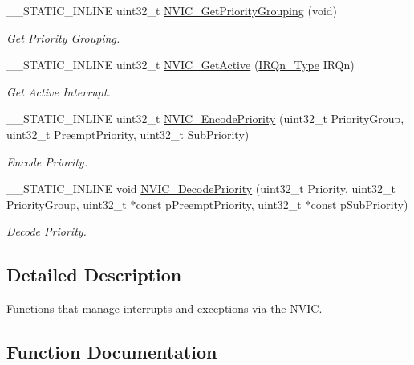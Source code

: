 \begin{DoxyCompactItemize}
\+\_\+\+\_\+\+S\+T\+A\+T\+I\+C\+\_\+\+I\+N\+L\+I\+NE uint32\+\_\+t \mbox{\hyperlink{group___c_m_s_i_s___core___n_v_i_c_functions_ga394f7ce2ca826c0da26284d17ac6524d}{N\+V\+I\+C\+\_\+\+Get\+Priority\+Grouping}} (void)
\begin{DoxyCompactList}\small\item\em Get Priority Grouping. \end{DoxyCompactList}\item 
\+\_\+\+\_\+\+S\+T\+A\+T\+I\+C\+\_\+\+I\+N\+L\+I\+NE uint32\+\_\+t \mbox{\hyperlink{group___c_m_s_i_s___core___n_v_i_c_functions_ga47a0f52794068d076c9147aa3cb8d8a6}{N\+V\+I\+C\+\_\+\+Get\+Active}} (\mbox{\hyperlink{group___peripheral__interrupt__number__definition_ga7e1129cd8a196f4284d41db3e82ad5c8}{I\+R\+Qn\+\_\+\+Type}} I\+R\+Qn)
\begin{DoxyCompactList}\small\item\em Get Active Interrupt. \end{DoxyCompactList}\item 
\+\_\+\+\_\+\+S\+T\+A\+T\+I\+C\+\_\+\+I\+N\+L\+I\+NE uint32\+\_\+t \mbox{\hyperlink{group___c_m_s_i_s___core___n_v_i_c_functions_gadb94ac5d892b376e4f3555ae0418ebac}{N\+V\+I\+C\+\_\+\+Encode\+Priority}} (uint32\+\_\+t Priority\+Group, uint32\+\_\+t Preempt\+Priority, uint32\+\_\+t Sub\+Priority)
\begin{DoxyCompactList}\small\item\em Encode Priority. \end{DoxyCompactList}\item 
\+\_\+\+\_\+\+S\+T\+A\+T\+I\+C\+\_\+\+I\+N\+L\+I\+NE void \mbox{\hyperlink{group___c_m_s_i_s___core___n_v_i_c_functions_ga3387607fd8a1a32cccd77d2ac672dd96}{N\+V\+I\+C\+\_\+\+Decode\+Priority}} (uint32\+\_\+t Priority, uint32\+\_\+t Priority\+Group, uint32\+\_\+t $\ast$const p\+Preempt\+Priority, uint32\+\_\+t $\ast$const p\+Sub\+Priority)
\begin{DoxyCompactList}\small\item\em Decode Priority. \end{DoxyCompactList}\end{DoxyCompactItemize}


\subsection{Detailed Description}
Functions that manage interrupts and exceptions via the N\+V\+IC. 



\subsection{Function Documentation}
\mbox{\label{group___c_m_s_i_s___core___n_v_i_c_functions_ga332e10ef9605dc6eb10b9e14511930f8}} 

